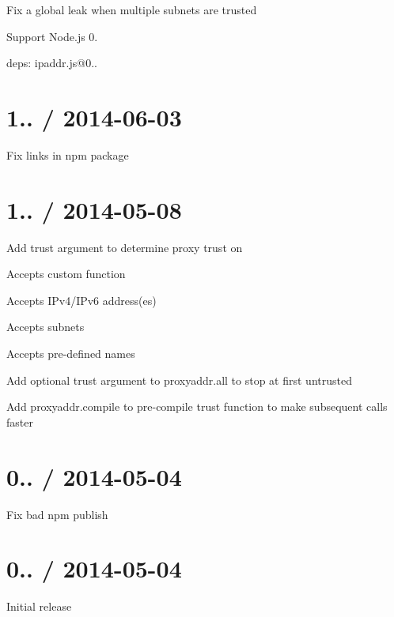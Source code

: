 \begin{DoxyItemize}
\item Fix a global leak when multiple subnets are trusted
\item Support Node.\+js 0.
\item deps\+: ipaddr.\+js@0..
\end{DoxyItemize}

\section*{1.. / 2014-\/06-\/03 }


\begin{DoxyItemize}
\item Fix links in npm package
\end{DoxyItemize}

\section*{1.. / 2014-\/05-\/08 }


\begin{DoxyItemize}
\item Add {\ttfamily trust} argument to determine proxy trust on
\begin{DoxyItemize}
\item Accepts custom function
\item Accepts I\+Pv4/\+I\+Pv6 address(es)
\item Accepts subnets
\item Accepts pre-\/defined names
\end{DoxyItemize}
\item Add optional {\ttfamily trust} argument to {\ttfamily proxyaddr.\+all} to stop at first untrusted
\item Add {\ttfamily proxyaddr.\+compile} to pre-\/compile {\ttfamily trust} function to make subsequent calls faster
\end{DoxyItemize}

\section*{0.. / 2014-\/05-\/04 }


\begin{DoxyItemize}
\item Fix bad npm publish
\end{DoxyItemize}

\section*{0.. / 2014-\/05-\/04 }


\begin{DoxyItemize}
\item Initial release 
\end{DoxyItemize}